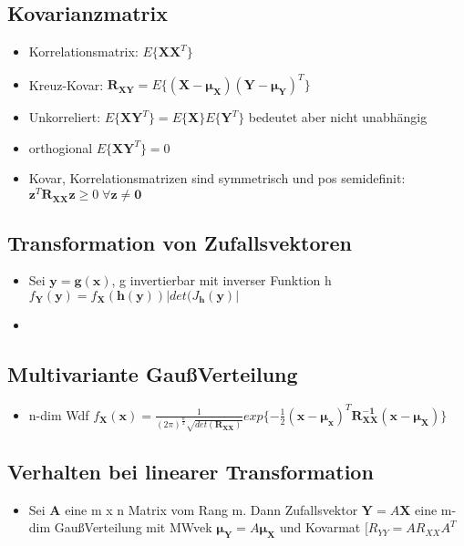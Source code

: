 \documentclass{article}
\begin{document}
\subsection{Kovarianzmatrix}
\begin{itemize}
\item Korrelationsmatrix: $ E\{\bm{XX}^T\}$
\item Kreuz-Kovar: $\bm{R_{XY}} = E\{ \bm{(X-\mu_X)(Y-\mu_Y)}^T \}$
\item Unkorreliert: $E\{ \bm{XY}^T\} = E\{ \bm{X}\}E\{\bm{Y}^T\}$ bedeutet aber nicht unabhängig
\item orthogional $E\{\bm{XY}^T\} = 0$
\item Kovar, Korrelationsmatrizen sind symmetrisch und pos semidefinit: \\ $\bm{z}^T \bm{R_{XX}z}\geq 0 \;\forall \bm{z \neq 0}$
\end{itemize}


\subsection{Transformation von Zufallsvektoren}
\begin{itemize}
\item Sei $\bm{y = g(x)}$, g invertierbar mit inverser Funktion h \\ $f_ {\bm{Y}}(\bm{y}) = f_{\bm{X}}(\bm{h(y)})|det(J_{\bm{h}}(\bm{y}) |$
\item
\end{itemize}

\subsection{Multivariante Gau\ss Verteilung}
\begin{itemize}
\item n-dim Wdf $f_{\bm{X}}(\bm{x}) = \frac{1}{(2\pi)^{\frac{n}{2}}\sqrt{det(\bm{R_{XX}})}}exp\{-\frac{1}{2}(\bm{x-\mu_x})^T \bm{R_{XX}^{-1}(x-\mu_X)} \}$
\end{itemize}

\subsection{Verhalten bei linearer Transformation}
\begin{itemize}
\item Sei $\bm{A}$ eine m x n Matrix vom Rang m. Dann Zufallsvektor $\bm{Y} = A \bm{X}$ eine m-dim Gau\ss Verteilung mit MWvek $\bm{\mu_Y} = A \bm{\mu_X}$ und Kovarmat $\bm[{R_{YY} = A R _{XX} A}^T$
\end{itemize}
\end{document}
